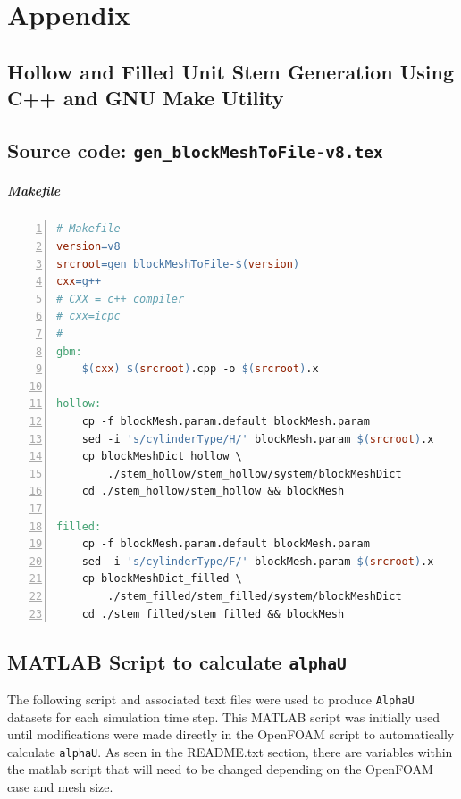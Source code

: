 \begin{onehalfspace}
\appendix
\end{onehalfspace}

\chapter{Appendix}

\section{Hollow and Filled Unit Stem Generation Using C++ and GNU Make Utility}

\section*{Source code: \texttt{\textmd{gen\_blockMeshToFile-v8.tex}}}



\paragraph*{Makefile}

\texttt{}
\begin{lstlisting}[language=make,numbers=left,basicstyle={\ttfamily},breaklines=true]
# Makefile 
version=v8
srcroot=gen_blockMeshToFile-$(version)
cxx=g++
# CXX = c++ compiler
# cxx=icpc
#
gbm:
	$(cxx) $(srcroot).cpp -o $(srcroot).x

hollow:
	cp -f blockMesh.param.default blockMesh.param
	sed -i 's/cylinderType/H/' blockMesh.param $(srcroot).x
	cp blockMeshDict_hollow \
		./stem_hollow/stem_hollow/system/blockMeshDict
	cd ./stem_hollow/stem_hollow && blockMesh

filled:
	cp -f blockMesh.param.default blockMesh.param
	sed -i 's/cylinderType/F/' blockMesh.param $(srcroot).x
	cp blockMeshDict_filled \
		./stem_filled/stem_filled/system/blockMeshDict
	cd ./stem_filled/stem_filled && blockMesh
\end{lstlisting}


\section{MATLAB Script to calculate \texttt{alphaU}}

The following script and associated text files were used to produce
\texttt{AlphaU} datasets for each simulation time step. This MATLAB
script was initially used until modifications were made directly in
the OpenFOAM script to automatically calculate \texttt{alphaU}. As
seen in the README.txt section, there are variables within the matlab
script that will need to be changed depending on the OpenFOAM case
and mesh size.

